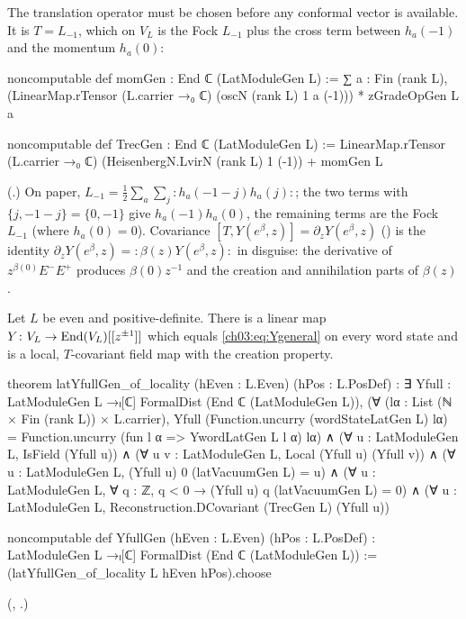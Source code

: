 The translation operator must be chosen before any conformal vector is available. It is
$T=L_{-1}$, which on $V_L$ is the Fock $L_{-1}$ plus the cross term between $h_a(-1)$ and the
momentum $h_a(0)$:
\begin{leancode}
noncomputable def momGen : End ℂ (LatModuleGen L) :=
  ∑ a : Fin (rank L), (LinearMap.rTensor (L.carrier →₀ ℂ) (oscN (rank L) 1 a (-1))) * zGradeOpGen L a

noncomputable def TrecGen : End ℂ (LatModuleGen L) :=
  LinearMap.rTensor (L.carrier →₀ ℂ) (HeisenbergN.LvirN (rank L) 1 (-1)) + momGen L
\end{leancode}
(.) On paper,
$L_{-1}=\frac12\sum_a\sum_j{:}h_a(-1-j)h_a(j){:}$; the two terms with $\{j,-1-j\}=\{0,-1\}$ give
$h_a(-1)h_a(0)$, the remaining terms are the Fock $L_{-1}$ (where $h_a(0)=0$). Covariance
$[T,Y(e^\beta,z)]=\partial_zY(e^\beta,z)$ () is the identity
$\partial_zY(e^\beta,z)={:}\beta(z)Y(e^\beta,z){:}$ in disguise: the derivative of
$z^{\beta(0)}E^-E^+$ produces $\beta(0)z^{-1}$ and the creation and annihilation parts of
$\beta(z)$.

\begin{theorem}\label{ch03:thm:latYfull}
Let $L$ be even and positive-definite. There is a linear map $Y\colon V_L\to\operatorname{End}(V_L)[[z^{\pm1}]]$
which equals \eqref{ch03:eq:Ygeneral} on every word state and is a local, $T$-covariant field map
with the creation property.
\end{theorem}
\begin{leancode}
theorem latYfullGen_of_locality (hEven : L.Even) (hPos : L.PosDef) :
    ∃ Yfull : LatModuleGen L →ₗ[ℂ] FormalDist (End ℂ (LatModuleGen L)),
      (∀ (lα : List (ℕ × Fin (rank L)) × L.carrier),
        Yfull (Function.uncurry (wordStateLatGen L) lα)
          = Function.uncurry (fun l α => YwordLatGen L l α) lα) ∧
      (∀ u : LatModuleGen L, IsField (Yfull u)) ∧
      (∀ u v : LatModuleGen L, Local (Yfull u) (Yfull v)) ∧
      (∀ u : LatModuleGen L, (Yfull u) 0 (latVacuumGen L) = u) ∧
      (∀ u : LatModuleGen L, ∀ q : ℤ, q < 0 → (Yfull u) q (latVacuumGen L) = 0) ∧
      (∀ u : LatModuleGen L, Reconstruction.DCovariant (TrecGen L) (Yfull u))

noncomputable def YfullGen (hEven : L.Even) (hPos : L.PosDef) :
    LatModuleGen L →ₗ[ℂ] FormalDist (End ℂ (LatModuleGen L)) :=
  (latYfullGen_of_locality L hEven hPos).choose
\end{leancode}
(, .)

